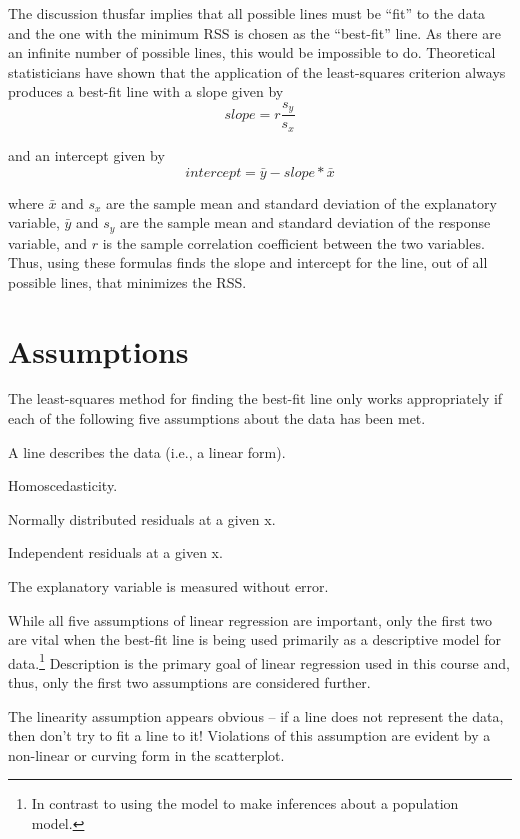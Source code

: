 \documentclass[10pt,openany]{book}\usepackage[]{graphicx}\usepackage[]{color}
\begin{document}
\vspace{12pt} %

The discussion thusfar implies that all possible lines must be ``fit'' to the data and the one with the minimum RSS is chosen as the ``best-fit'' line. As there are an infinite number of possible lines, this would be impossible to do. Theoretical statisticians have shown that the application of the least-squares criterion always produces a best-fit line with a slope given by
  \[ slope = r\frac{s_{y}}{s_{x}}  \]

and an intercept given by
  \[ intercept = \bar{y}-slope*\bar{x}   \]

where $\bar{x}$ and $s_{x}$ are the sample mean and standard deviation of the explanatory variable, $\bar{y}$ and $s_{y}$ are the sample mean and standard deviation of the response variable, and $r$ is the sample correlation coefficient between the two variables. Thus, using these formulas finds the slope and intercept for the line, out of all possible lines, that minimizes the RSS.


\section{Assumptions}\label{sect:RegAssumptions}
The least-squares method for finding the best-fit line only works appropriately if each of the following five assumptions about the data has been met.

\begin{Enumerate}
  \item A line describes the data (i.e., a linear form).
  \item Homoscedasticity.
  \item Normally distributed residuals at a given x.
  \item Independent residuals at a given x.
  \item The explanatory variable is measured without error.
\end{Enumerate}

While all five assumptions of linear regression are important, only the first two are vital when the best-fit line is being used primarily as a descriptive model for data.\footnote{In contrast to using the model to make inferences about a population model.}  Description is the primary goal of linear regression used in this course and, thus, only the first two assumptions are considered further.

The linearity assumption appears obvious -- if a line does not represent the data, then don't try to fit a line to it!  Violations of this assumption are evident by a non-linear or curving form in the scatterplot.
\end{document}

